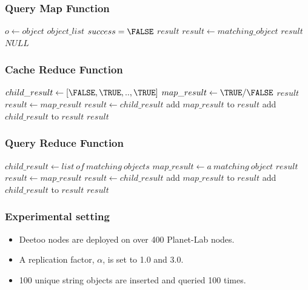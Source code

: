 \documentclass[red]{beamer}
\begin{document}
\begin{frame}
\frametitle{Query Map Function}
\begin{algorithmic}[1]
\STATE $o \leftarrow object$     
\STATE $object\_list$ %
\STATE $success = \FALSE$ %
\STATE $result$
  \STATE $result \leftarrow matching\_object$
  \RETURN $result$
\ELSE
  \RETURN $NULL$
\ENDIF
\end{algorithmic}
\end{frame}

\begin{frame}
\frametitle{Cache Reduce Function}
\begin{algorithmic}[1]
\STATE $child\_result \leftarrow [\FALSE, \TRUE,..,\TRUE]$ 
\STATE $map\_result \leftarrow \TRUE/\FALSE$ 
\STATE $result$
  \STATE $result \leftarrow map\_result$
  \STATE $result \leftarrow child\_result$
\ELSE
  \STATE add $map\_result$ to $result$
  \STATE add $child\_result$ to $result$
\ENDIF
\RETURN $result$
\end{algorithmic}
\end{frame}

\begin{frame}
\frametitle{Query Reduce Function}
\begin{algorithmic}[1]
\STATE $child\_result \leftarrow list\ of\ matching\ objects$ 
\STATE $map\_result \leftarrow a\ matching\ object$ 
\STATE $result$
  \STATE $result \leftarrow map\_result$
  \STATE $result \leftarrow child\_result$
\ELSE
  \STATE add $map\_result$ to $result$
  \STATE add $child\_result$ to $result$
\ENDIF
\RETURN $result$
\end{algorithmic}
\end{frame}

\begin{frame}
\frametitle{Experimental setting}
\begin{itemize}
\item Deetoo nodes are deployed on over 400 Planet-Lab nodes. 
\item A replication factor, $\alpha$, is set to 1.0 and 3.0.
\item 100 unique string objects are inserted and queried 100 times.
\end{itemize}
\end{frame}
\end{document}
